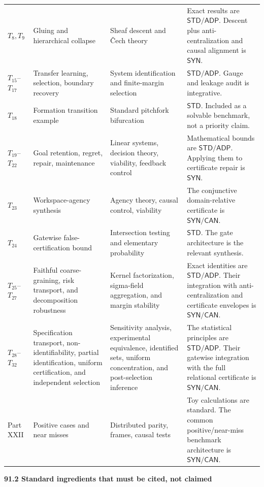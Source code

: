 \documentclass[11pt,letterpaper]{article}
\newcommand{\subtopic}[1]{%
 \vspace{0.45em}
 {\bfseries\color{AccentColor} #1\par}
}
\theoremstyle{plain}
\theoremstyle{definition}
\begin{document}
\begin{longtable}{@{}>{\raggedright\arraybackslash}p{}>{\raggedright\arraybackslash}p{}>{\raggedright\arraybackslash}p{}>{\raggedright\arraybackslash}p{}@{}}
\(T_8,T_9\) & Gluing and hierarchical collapse & Sheaf descent and \v{C}ech theory & Exact results are \(\mathsf{STD}/\mathsf{ADP}\). Descent plus anti-centralization and causal alignment is \(\mathsf{SYN}\). \\
\(T_{15}\)--\(T_{17}\) & Transfer learning, selection, boundary recovery & System identification and finite-margin selection & \(\mathsf{STD}/\mathsf{ADP}\). Gauge and leakage audit is integrative. \\
\(T_{18}\) & Formation transition example & Standard pitchfork bifurcation & \(\mathsf{STD}\). Included as a solvable benchmark, not a priority claim. \\
\(T_{19}\)--\(T_{22}\) & Goal retention, regret, repair, maintenance & Linear systems, decision theory, viability, feedback control & Mathematical bounds are \(\mathsf{STD}/\mathsf{ADP}\). Applying them to certificate repair is \(\mathsf{SYN}\). \\
\(T_{23}\) & Workspace-agency synthesis & Agency theory, causal control, viability & The conjunctive domain-relative certificate is \(\mathsf{SYN}/\mathsf{CAN}\). \\
\(T_{24}\) & Gatewise false-certification bound & Intersection testing and elementary probability & \(\mathsf{STD}\). The gate architecture is the relevant synthesis. \\
\(T_{25}\)--\(T_{27}\) & Faithful coarse-graining, risk transport, and decomposition robustness & Kernel factorization, sigma-field aggregation, and margin stability & Exact identities are \(\mathsf{STD}/\mathsf{ADP}\). Their integration with anti-centralization and certificate envelopes is \(\mathsf{SYN}/\mathsf{CAN}\). \\
\(T_{28}\)--\(T_{32}\) & Specification transport, non-identifiability, partial identification, uniform certification, and independent selection & Sensitivity analysis, experimental equivalence, identified sets, uniform concentration, and post-selection inference & The statistical principles are \(\mathsf{STD}/\mathsf{ADP}\). Their gatewise integration with the full relational certificate is \(\mathsf{SYN}/\mathsf{CAN}\). \\
Part XXII & Positive cases and near misses & Distributed parity, frames, causal tests & Toy calculations are standard. The common positive/near-miss benchmark architecture is \(\mathsf{SYN}/\mathsf{CAN}\). \\
\bottomrule
\end{longtable}
\normalsize

\subtopic{91.2 Standard ingredients that must be cited, not claimed}
\end{document}
